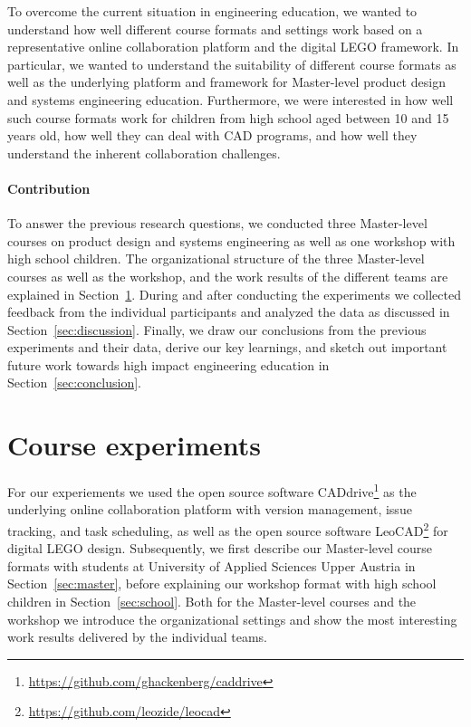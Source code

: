 \documentclass{PDS}
\begin{document}
To overcome the current situation in engineering education, we wanted to understand how well different course formats and settings work based on a representative online collaboration platform and the digital LEGO framework.
In particular, we wanted to understand the suitability of different course formats as well as the underlying platform and framework for Master-level product design and systems engineering education.
Furthermore, we were interested in how well such course formats work for children from high school aged between 10 and 15 years old, how well they can deal with CAD programs, and how well they understand the inherent collaboration challenges.

\paragraph{Contribution}

To answer the previous research questions, we conducted three Master-level courses on product design and systems engineering as well as one workshop with high school children.
The organizational structure of the three Master-level courses as well as the workshop, and the work results of the different teams are explained in Section~\ref{sec:contribution}.
During and after conducting the experiments we collected feedback from the individual participants and analyzed the data as discussed in Section~\ref{sec:discussion}.
Finally, we draw our conclusions from the previous experiments and their data, derive our key learnings, and sketch out important future work towards high impact engineering education in Section~\ref{sec:conclusion}.

\section{Course experiments}
\label{sec:contribution}

For our experiements we used the open source software CADdrive\footnote{\url{https://github.com/ghackenberg/caddrive}} as the underlying online collaboration platform with version management, issue tracking, and task scheduling, as well as the open source software LeoCAD\footnote{\url{https://github.com/leozide/leocad}} for digital LEGO design.
Subsequently, we first describe our Master-level course formats with students at University of Applied Sciences Upper Austria in Section~\ref{sec:master}, before explaining our workshop format with high school children in Section~\ref{sec:school}.
Both for the Master-level courses and the workshop we introduce the organizational settings and show the most interesting work results delivered by the individual teams.
\end{document}
